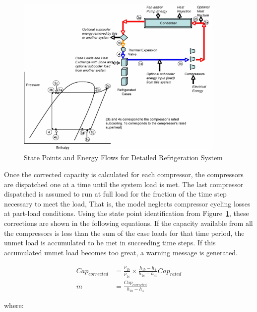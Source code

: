 \begin{figure}[hbtp] %
\centering
\includegraphics[width=0.9\textwidth, height=0.9\textheight, keepaspectratio=true]{media/image6275.png}
\caption{State Points and Energy Flows for Detailed Refrigeration System \protect \label{fig:state-points-and-energy-flows-for-detailed}}
\end{figure}

Once the corrected capacity is calculated for each compressor, the compressors are dispatched one at a time until the system load is met. The last compressor dispatched is assumed to run at full load for the fraction of the time step necessary to meet the load, That is, the model neglects compressor cycling losses at part-load conditions. Using the state point identification from Figure~\ref{fig:state-points-and-energy-flows-for-detailed}, these corrections are shown in the following equations. If the capacity available from all the compressors is less than the sum of the case loads for that time period, the unmet load is accumulated to be met in succeeding time steps. If this accumulated unmet load becomes too great, a warning message is generated.

\begin{equation}
  \begin{array}{rl}
    Cap_{corrected} &= \frac{\rho_{1b}}{\rho_{1c}} \times \frac{h_{1b} - h_4}{h_{1c} - h_{4c}} Cap_{rated} \\
    \dot{m} &= \frac{Cap_{corrected}}{h_{1b} - h_4}
  \end{array}
\end{equation}

where:

